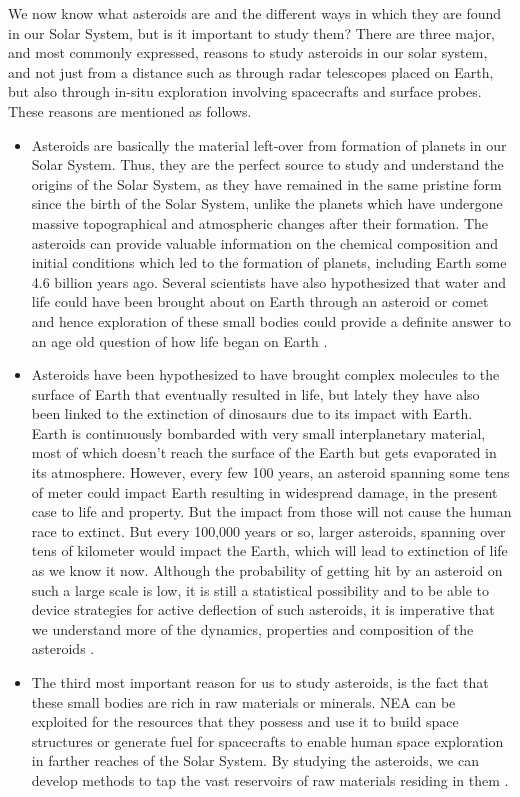 We now know what asteroids are and the different ways in which they are found in our Solar System, but is it important to study them? There are three major, and most commonly expressed, reasons to study asteroids in our solar system, and not just from a distance such as through radar telescopes placed on Earth, but also through in-situ exploration involving spacecrafts and surface probes. These reasons are mentioned as follows.
\begin{itemize}
\item Asteroids are basically the material left-over from formation of planets in our Solar System. Thus, they are the perfect source to study and understand the origins of the Solar System, as they have remained in the same pristine form since the birth of the Solar System, unlike the planets which have undergone massive topographical and atmospheric changes after their formation. The asteroids can provide valuable information on the chemical composition and initial conditions which led to the formation of planets, including Earth some 4.6 billion years ago. Several scientists have also hypothesized that water and life could have been brought about on Earth through an asteroid or comet and hence exploration of these small bodies could provide a definite answer to an age old question of how life began on Earth \parencite{whyAsteroidsWeb}.
\item Asteroids have been hypothesized to have brought complex molecules to the surface of Earth that eventually resulted in life, but lately they have also been linked to the extinction of dinosaurs due to its impact with Earth. Earth is continuously bombarded with very small interplanetary material, most of which doesn't reach the surface of the Earth but gets evaporated in its atmosphere. However, every few 100 years, an asteroid spanning some tens of meter could impact Earth resulting in widespread damage, in the present case to life and property. But the impact from those will not cause the human race to extinct. But every 100,000 years or so, larger asteroids, spanning over tens of kilometer would impact the Earth, which will lead to extinction of life as we know it now. Although the probability of getting hit by an asteroid on such a large scale is low, it is still a statistical possibility and to be able to device strategies for active deflection of such asteroids, it is imperative that we understand more of the dynamics, properties and composition of the asteroids \parencite{whyAsteroidsWeb}.
\item The third most important reason for us to study asteroids, is the fact that these small bodies are rich in raw materials or minerals. \gls{NEA} can be exploited for the resources that they possess and use it to build space structures or generate fuel for spacecrafts to enable human space exploration in farther reaches of the Solar System. By studying the asteroids, we can develop methods to tap the vast reservoirs of raw materials residing in them \parencite{whyAsteroidsWeb}.
\end{itemize}




